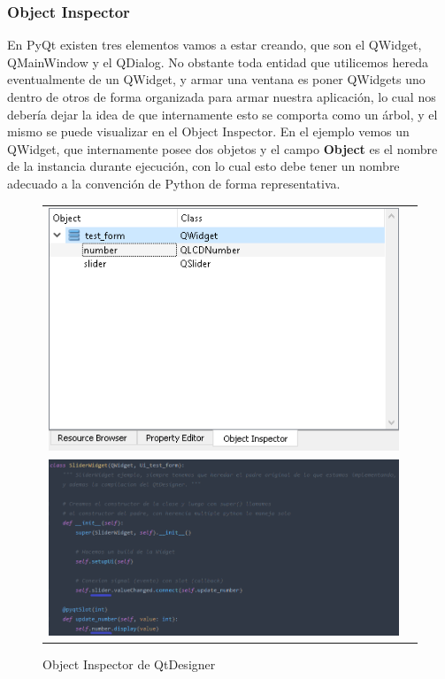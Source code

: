 \subsubsection{Object Inspector}
En PyQt existen tres elementos vamos a estar creando, que son el QWidget, QMainWindow y el QDialog. No obstante toda entidad que utilicemos hereda eventualmente
de un QWidget, y armar una ventana es poner QWidgets uno dentro de otros de forma organizada para armar nuestra aplicaci\'on, lo cual nos deber\'ia dejar la idea
de que internamente esto se comporta como un \'arbol, y el mismo se puede visualizar en el Object Inspector.
En el ejemplo vemos un QWidget, que internamente posee dos objetos y el campo \textbf{Object} es el nombre de la instancia durante ejecuci\'on,
con lo cual esto debe tener un nombre adecuado a la convenci\'on de Python de forma representativa.

\begin{figure}[H]
    \centering
    \begin{tabular}{c c}
        \includegraphics[scale=0.7]{imagenes/qtdesigner/qt_object_inspector.PNG} \\
        \includegraphics[scale=0.4]{imagenes/qtdesigner/qt_object_inspector_3.png}
    \end{tabular}
    \caption{Object Inspector de QtDesigner}
    \label{fig:qt_object_inspector}
\end{figure}

